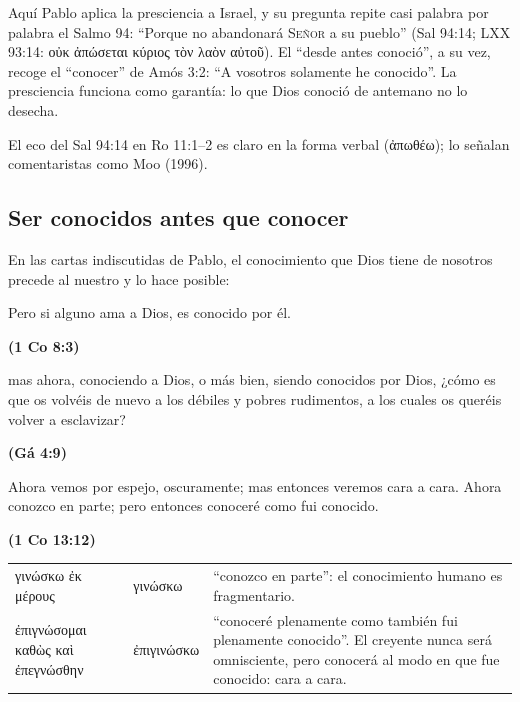 \documentclass[11pt,letterpaper]{article}
\newcommand{\grc}[1]{\foreignlanguage{ancientgreek}{#1}}
\newcommand{\SENOR}{\textsc{Señor}}
\newcommand{\fuente}[1]{\par\hfill{\upshape\bfseries\small\textcolor{azul}{#1}}}
\begin{document}
Aquí Pablo aplica la presciencia a Israel, y su pregunta repite casi palabra por palabra el Salmo 94: ``Porque no abandonará \SENOR{} a su pueblo'' (Sal 94:14; LXX 93:14: \grc{οὐκ ἀπώσεται κύριος τὸν λαὸν αὐτοῦ}). El ``desde antes conoció'', a su vez, recoge el ``conocer'' de Amós 3:2: ``A vosotros solamente he conocido''. La presciencia funciona como garantía: lo que Dios conoció de antemano no lo desecha.

\begin{nota}[Precisión]
El eco del Sal 94:14 en Ro 11:1--2 es claro en la forma verbal (\grc{ἀπωθέω}); lo señalan comentaristas como Moo (1996).
\end{nota}

\subsection{Ser conocidos antes que conocer}
En las cartas indiscutidas de Pablo, el conocimiento que Dios tiene de nosotros precede al nuestro y lo hace posible:

\begin{cita}Pero si alguno ama a Dios, es conocido por él.\fuente{(1 Co 8:3)}\end{cita}

\begin{cita}mas ahora, conociendo a Dios, o más bien, siendo conocidos por Dios, ¿cómo es que os volvéis de nuevo a los débiles y pobres rudimentos, a los cuales os queréis volver a esclavizar?\fuente{(Gá 4:9)}\end{cita}

\begin{cita}Ahora vemos por espejo, oscuramente; mas entonces veremos cara a cara. Ahora conozco en parte; pero entonces conoceré como fui conocido.\fuente{(1 Co 13:12)}\end{cita}

\begin{filologia}[1 Co 13:12]
\begin{tabular}{@{}L{3.2cm}L{1.6cm}L{10cm}@{}}
\grc{γινώσκω ἐκ μέρους} & \grc{γινώσκω} & ``conozco en parte'': el conocimiento humano es fragmentario. \\[2pt]
\grc{ἐπιγνώσομαι καθὼς καὶ ἐπεγνώσθην} & \grc{ἐπιγινώσκω} & ``conoceré plenamente como también fui plenamente conocido''. El creyente nunca será omnisciente, pero conocerá al modo en que fue conocido: cara a cara. \\
\end{tabular}
\end{filologia}
\end{document}
